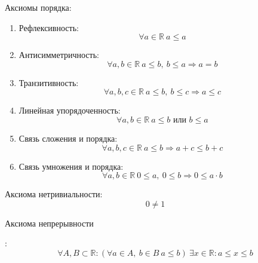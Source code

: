 Аксиомы порядка:
\begin{enumerate}
	\item Рефлексивность:
	\begin{equation*}
	\forall a \in \mathbb R \
	a \leqslant a
	\end{equation*}
	
	\item Антисимметричность:
	\begin{equation*}
	\forall a, b \in \mathbb R \
	a \leqslant b, \ b \leqslant a \Rightarrow a = b
	\end{equation*}
	
	\item Транзитивность:
	\begin{equation*}
	\forall a, b, c \in \mathbb R \
	a \leqslant b, \ b \leqslant c \Rightarrow a \leqslant c
	\end{equation*}
	
	\item Линейная упорядоченность:
	\begin{equation*}
	\forall a, b \in \mathbb R \
	a \leqslant b \text{ или } b \leqslant a
	\end{equation*}
	
	\item Связь сложения и порядка:
	\begin{equation*}
	\forall a, b, c \in \mathbb R \
	a \leqslant b \Rightarrow a + c \leqslant b + c
	\end{equation*}
	
	\item Связь умножения и порядка:
	\begin{equation*}
	\forall a, b \in \mathbb R \
	0 \leqslant a, \ 0 \leqslant b \Rightarrow 0 \leqslant a \cdot b
	\end{equation*}
\end{enumerate}

Аксиома нетривиальности:
\begin{equation*}
0 \neq 1
\end{equation*}

\hypertarget{eq:continuity_axiom}{Аксиома непрерывности}:
\begin{equation*}
\forall A, B \subset \mathbb R \colon
(\forall a \in A, \ b \in B \ a \leqslant b) \
\exists x \in \mathbb R \colon
a \leqslant x \leqslant b
\end{equation*}